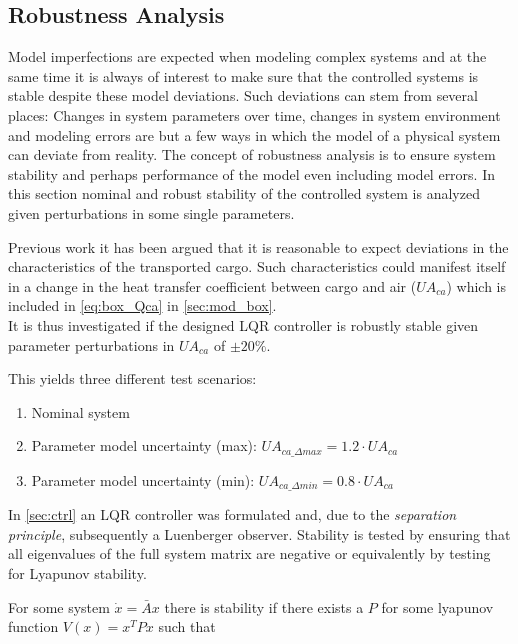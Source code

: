 \subsection{Robustness Analysis}\label{sec:robustness-analysis}

Model imperfections are expected when modeling complex systems and at the same time it is always of interest to make sure that the controlled systems is stable despite these model deviations. Such deviations can stem from several places: Changes in system parameters over time, changes in system environment and modeling errors are but a few ways in which the model of a physical system can deviate from reality. The concept of robustness analysis is to ensure system stability and perhaps performance of the model even including model errors. In this section nominal and robust stability of the controlled system is analyzed given perturbations in some single parameters.

Previous work \cite{Borlum2016} it has been argued that it is reasonable to expect deviations in the characteristics of the transported cargo. Such characteristics could manifest itself in a change in the heat transfer coefficient between cargo and air ($U A_{ca}$) which is included in \cref{eq:box_Qca} in \cref{sec:mod_box}.\\

It is thus investigated if the designed LQR controller is robustly stable given parameter perturbations in $U A_{ca}$ of $\pm 20 \%$.

This yields three different test scenarios:

\begin{enumerate}
	\item Nominal system
	\item Parameter model uncertainty (max): $U A_{ca\_\Delta max} = 1.2 \cdot U A_{ca}$
	\item Parameter model uncertainty (min): $U A_{ca\_\Delta min} = 0.8 \cdot U A_{ca}$
\end{enumerate}

\smallskip

In \cref{sec:ctrl} an LQR controller was formulated and, due to the \textit{separation principle}, subsequently a Luenberger observer. Stability is tested by ensuring that all eigenvalues of the full system matrix are negative or equivalently by testing for Lyapunov stability.

For some system $\dot{x} = \bar{A}x$ there is stability if there exists a $P$ for some lyapunov function $V(x) = x^TPx$ such that

